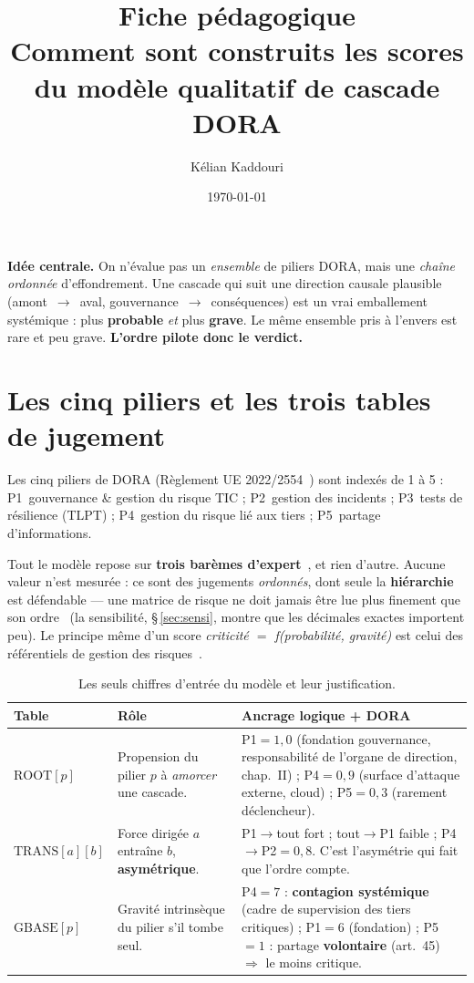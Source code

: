 \documentclass[11pt,a4paper]{article}
\title{\vspace{-1.2cm}\color{navy}\bfseries Fiche pédagogique\\[2pt]
  \large Comment sont construits les scores du modèle qualitatif de cascade DORA}
\author{Kélian Kaddouri}
\date{\today}
\newcommand{\fl}{\ensuremath{\!\rightarrow\!}}
\begin{document}
\maketitle
\vspace{-0.6cm}

\begin{cle}
\textbf{Idée centrale.} On n'évalue pas un \emph{ensemble} de piliers DORA, mais une
\emph{chaîne ordonnée} d'effondrement. Une cascade qui suit une direction causale
plausible (amont~\fl~aval, gouvernance~\fl~conséquences) est un vrai emballement
systémique : plus \textbf{probable} \emph{et} plus \textbf{grave}. Le même ensemble pris
à l'envers est rare et peu grave. \textbf{L'ordre pilote donc le verdict.}
\end{cle}

\section{Les cinq piliers et les trois tables de jugement}

Les cinq piliers de DORA (Règlement UE 2022/2554~\cite{DORA2022}) sont indexés de 1 à 5 :
P1~gouvernance \& gestion du risque TIC ; P2~gestion des incidents ; P3~tests de
résilience (TLPT) ; P4~gestion du risque lié aux tiers ; P5~partage d'informations.

Tout le modèle repose sur \textbf{trois barèmes d'expert}~\cite{Cooke1991,OHagan2006}, et
rien d'autre. Aucune valeur n'est mesurée : ce sont des jugements \emph{ordonnés}, dont
seule la \textbf{hiérarchie} est défendable --- une matrice de risque ne doit jamais être
lue plus finement que son ordre~\cite{Cox2008} (la sensibilité, \S\,\ref{sec:sensi}, montre
que les décimales exactes importent peu). Le principe même d'un score
\emph{criticité $=$ f(probabilité, gravité)} est celui des référentiels de gestion des
risques~\cite{ISO31000,ISO27005}.

\begin{table}[h]\centering\small
\renewcommand{\arraystretch}{1.25}
\begin{tabular}{@{}p{2.1cm} p{5.3cm} p{6.9cm}@{}}
\toprule
\textbf{Table} & \textbf{Rôle} & \textbf{Ancrage logique + DORA} \\
\midrule
$\text{ROOT}[p]$ & Propension du pilier $p$ à \emph{amorcer} une cascade.
  & P1$=1{,}0$ (fondation gouvernance, responsabilité de l'organe de direction, chap.~II) ;
    P4$=0{,}9$ (surface d'attaque externe, cloud) ; P5$=0{,}3$ (rarement déclencheur). \\
$\text{TRANS}[a][b]$ & Force dirigée \og{}$a$ entraîne $b$\fg{}, \textbf{asymétrique}.
  & P1$\fl$tout fort ; tout$\fl$P1 faible ; P4$\fl$P2$=0{,}8$. C'est l'asymétrie qui fait
    que l'ordre compte. \\
$\text{GBASE}[p]$ & Gravité intrinsèque du pilier s'il tombe seul.
  & P4$=7$ : \textbf{contagion systémique} (cadre de supervision des tiers critiques) ;
    P1$=6$ (fondation) ; P5$=1$ : partage \textbf{volontaire} (art.~45) $\Rightarrow$ le
    moins critique. \\
\bottomrule
\end{tabular}
\caption{Les seuls chiffres d'entrée du modèle et leur justification.}
\end{table}
\end{document}
